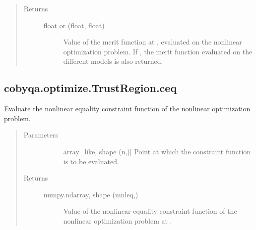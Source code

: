 \documentclass[letterpaper,10pt,english]{sphinxmanual}
\begin{document}
\begin{fulllineitems}
\begin{fulllineitems}
\begin{quote}
\begin{description}
\begin{description}
\end{description}

\item[{Returns}] \leavevmode\begin{description}
\item[{float or (float, float)}] \leavevmode
\sphinxAtStartPar
Value of the merit function at , evaluated on the nonlinear
optimization problem. If , the merit function
evaluated on the different models is also returned.

\end{description}

\end{description}\end{quote}

\end{fulllineitems}



\subsection{cobyqa.optimize.TrustRegion.ceq}
\label{\detokenize{refs/generated/cobyqa.optimize.TrustRegion.ceq:cobyqa-optimize-trustregion-ceq}}\label{\detokenize{refs/generated/cobyqa.optimize.TrustRegion.ceq::doc}}

\begin{fulllineitems}
\label{\detokenize{refs/generated/cobyqa.optimize.TrustRegion.ceq:cobyqa.optimize.TrustRegion.ceq}}
\sphinxAtStartPar
Evaluate the nonlinear equality constraint function of the nonlinear
optimization problem.
\begin{quote}\begin{description}
\item[{Parameters}] \leavevmode\begin{description}
\item[{}] \leavevmode{[}array\_like, shape (n,){]}
\sphinxAtStartPar
Point at which the constraint function is to be evaluated.

\end{description}

\item[{Returns}] \leavevmode\begin{description}
\item[{numpy.ndarray, shape (mnleq,)}] \leavevmode
\sphinxAtStartPar
Value of the nonlinear equality constraint function of the
nonlinear optimization problem at .


\end{description}
\end{description}
\end{quote}
\end{fulllineitems}
\end{fulllineitems}
\end{document}
